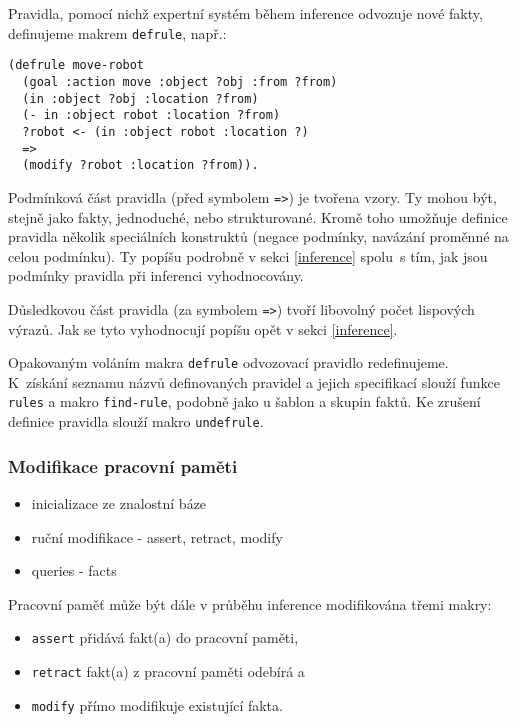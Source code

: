 Pravidla, pomocí nichž expertní systém během inference odvozuje nové fakty,
definujeme makrem
\verb|defrule|, např.:
\begin{verbatim}
(defrule move-robot
  (goal :action move :object ?obj :from ?from)
  (in :object ?obj :location ?from)
  (- in :object robot :location ?from)
  ?robot <- (in :object robot :location ?)
  =>
  (modify ?robot :location ?from)).
\end{verbatim}
Podmínková část pravidla (před symbolem \verb|=>|) je tvořena vzory. Ty mohou
být, stejně jako fakty, jednoduché, nebo strukturované. Kromě toho umožňuje
definice pravidla několik speciálních konstruktů (negace podmínky, navázání
proměnné na celou podmínku). Ty popíšu podrobně v sekci \ref{inference} spolu~s
tím, jak jsou podmínky pravidla při inferenci vyhodnocovány.

Důsledkovou část pravidla (za symbolem \verb|=>|) tvoří libovolný počet
lispových výrazů. Jak se tyto vyhodnocují popíšu opět v sekci \ref{inference}.

Opakovaným voláním makra \verb|defrule| odvozovací pravidlo redefinujeme.
K~získání seznamu názvů definovaných pravidel a jejich specifikací slouží funkce
\verb|rules| a makro \verb|find-rule|, podobně jako u šablon a skupin faktů.
Ke zrušení definice pravidla slouží makro \verb|undefrule|.

\subsubsection{Modifikace pracovní paměti}
\label{modifikace}
\begin{framed}
  \begin{itemize}
    \item inicializace ze znalostní báze
    \item ruční modifikace - assert, retract, modify
    \item queries - facts
  \end{itemize}
\end{framed}

Pracovní paměť může být dále v průběhu inference modifikována třemi makry:
\begin{itemize}
  \item \verb|assert| přidává fakt(a) do pracovní paměti,
  \item \verb|retract| fakt(a) z pracovní paměti odebírá a
  \item \verb|modify| přímo modifikuje existující fakta.
\end{itemize}

